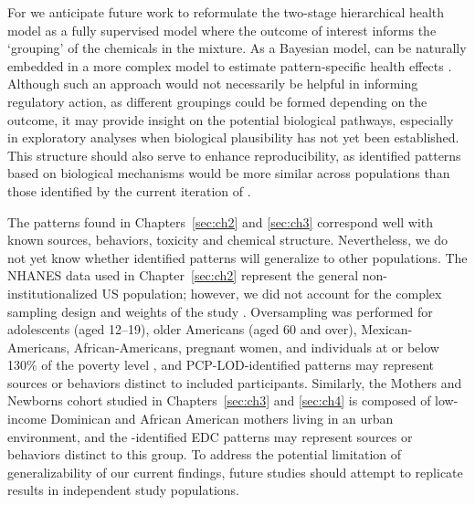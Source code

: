 For \bnmf we anticipate future work to reformulate the two-stage hierarchical health model as a fully supervised model where the outcome of interest informs the `grouping' of the chemicals in the mixture. As a Bayesian model, \bnmf can be naturally embedded in a more complex model to estimate pattern-specific health effects \citep{bda3}. Although such an approach would not necessarily be helpful in informing regulatory action, as different groupings could be formed depending on the outcome, it may provide insight on the potential biological pathways, especially in exploratory analyses when biological plausibility has not yet been established. This structure should also serve to enhance reproducibility, as identified patterns based on biological mechanisms would be more similar across populations than those identified by the current iteration of \bnmfc.


The patterns found in Chapters~\ref{sec:ch2} and \ref{sec:ch3} correspond well with known sources, behaviors, toxicity and chemical structure. Nevertheless, we do not yet know whether identified patterns will generalize to other populations. The NHANES data used in Chapter~\ref{sec:ch2} represent the general non-institutionalized US population; however, we did not account for the complex sampling design and weights of the study \citep{johnson2013national}. Oversampling was performed for adolescents (aged 12–19), older Americans (aged 60 and over), Mexican-Americans, African-Americans, pregnant women, and individuals at or below 130\% of the poverty level \citep{curtin2012national}, and PCP-LOD-identified patterns may represent sources or behaviors distinct to included participants. Similarly, the Mothers and Newborns cohort studied in Chapters~\ref{sec:ch3} and \ref{sec:ch4} is composed of low-income Dominican and African American mothers living in an urban environment, and the \bnmfc-identified EDC patterns may represent sources or behaviors distinct to this group. To address the potential limitation of generalizability of our current findings, future studies should attempt to replicate results in independent study populations.


